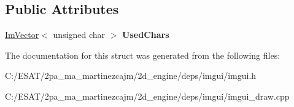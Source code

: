 \subsection*{Public Attributes}
\begin{DoxyCompactItemize}
\item 
\mbox{\label{struct_im_font_atlas_1_1_glyph_ranges_builder_a369924c3fbeeac0402a6c02d62dd4a71}} 
\hyperlink{class_im_vector}{Im\+Vector}$<$ unsigned char $>$ {\bfseries Used\+Chars}
\end{DoxyCompactItemize}


The documentation for this struct was generated from the following files\+:\begin{DoxyCompactItemize}
\item 
C\+:/\+E\+S\+A\+T/2pa\+\_\+ma\+\_\+martinezcajm/2d\+\_\+engine/deps/imgui/imgui.\+h\item 
C\+:/\+E\+S\+A\+T/2pa\+\_\+ma\+\_\+martinezcajm/2d\+\_\+engine/deps/imgui/imgui\+\_\+draw.\+cpp\end{DoxyCompactItemize}
